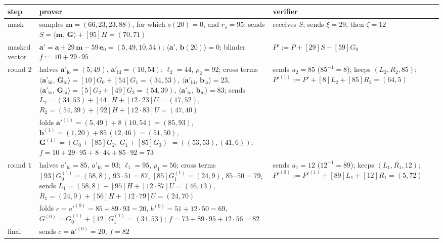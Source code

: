 \documentclass[11pt,a4paper]{article}
\theoremstyle{definition}
\newcommand{\ip}[2]{\langle #1,\, #2 \rangle}
\begin{document}
\begin{table}[htbp]
\centering
\footnotesize
\begin{tabular}{@{}l p{5.6cm} p{5.6cm}@{}}
\toprule
step & prover & verifier \\
\midrule
mask
 & samples $\mathbf m = (66, 23, 23, 88)$, for which $s(20) = 0$, and
   $r_s = 95$; sends $S = \ip{\mathbf m}{\mathbf G} + [95]H = (70, 71)$
 & receives $S$; sends $\xi = 29$, then $\zeta = 12$ \\
\addlinespace
masked vector
 & $\mathbf a' = \mathbf a + 29\,\mathbf m - 59\,\mathbf e_0
   = (5, 49, 10, 54)$; $\ip{\mathbf a'}{\mathbf b(20)} = 0$;
   blinder $f := 10 + 29 \cdot 95$
 & $P' := P + [29]S - [59]G_0$ \\
\addlinespace
round $2$
 & halves $\mathbf a'_{\mathrm{lo}} = (5, 49)$,
   $\mathbf a'_{\mathrm{hi}} = (10, 54)$; $\ell_2 = 44$, $\rho_2 = 92$;
   cross terms $\ip{\mathbf a'_{\mathrm{hi}}}{\mathbf G_{\mathrm{lo}}}
   = [10]G_0 + [54]G_1 = (34, 53)$,
   $\ip{\mathbf a'_{\mathrm{hi}}}{\mathbf b_{\mathrm{lo}}} = 23$,
   $\ip{\mathbf a'_{\mathrm{lo}}}{\mathbf G_{\mathrm{hi}}}
   = [5]G_2 + [49]G_3 = (54, 39)$,
   $\ip{\mathbf a'_{\mathrm{lo}}}{\mathbf b_{\mathrm{hi}}} = 83$;
   sends $L_2 = (34, 53) + [44]H + [12 \cdot 23]U = (17, 52)$,
   $R_2 = (54, 39) + [92]H + [12 \cdot 83]U = (47, 40)$
 & sends $u_2 = 85$ ($85^{-1} = 8$); keeps $(L_2, R_2, 85)$;
   $P'^{(1)} := P' + [8]L_2 + [85]R_2 = (64, 5)$ \\
 & folds $\mathbf a'^{(1)} = (5, 49) + 8\,(10, 54) = (85, 93)$,
   $\mathbf b^{(1)} = (1, 20) + 85\,(12, 46) = (51, 50)$,
   $\mathbf G^{(1)} = (G_0 + [85]G_2,\ G_1 + [85]G_3)$
   $= ((53, 53), (41, 6))$;
   $f = 10 + 29 \cdot 95 + 8 \cdot 44 + 85 \cdot 92 = 73$
 & \\
\addlinespace
round $1$
 & halves $a'_{\mathrm{lo}} = 85$, $a'_{\mathrm{hi}} = 93$;
   $\ell_1 = 95$, $\rho_1 = 56$;
   cross terms $[93]G^{(1)}_0 = (58, 8)$, $93 \cdot 51 = 87$,
   $[85]G^{(1)}_1 = (24, 9)$, $85 \cdot 50 = 79$;
   sends $L_1 = (58, 8) + [95]H + [12 \cdot 87]U = (46, 13)$,
   $R_1 = (24, 9) + [56]H + [12 \cdot 79]U = (24, 70)$
 & sends $u_1 = 12$ ($12^{-1} = 89$); keeps $(L_1, R_1, 12)$;
   $P'^{(0)} := P'^{(1)} + [89]L_1 + [12]R_1 = (5, 72)$ \\
 & folds $c = a'^{(0)} = 85 + 89 \cdot 93 = 20$,
   $b^{(0)} = 51 + 12 \cdot 50 = 69$,
   $G^{(0)} = G^{(1)}_0 + [12]G^{(1)}_1 = (34, 53)$;
   $f = 73 + 89 \cdot 95 + 12 \cdot 56 = 82$
 & \\
\addlinespace
final
 & sends $c = \mathbf a'^{(0)} = 20$, $f = 82$

\end{tabular}
\end{table}
\end{document}
